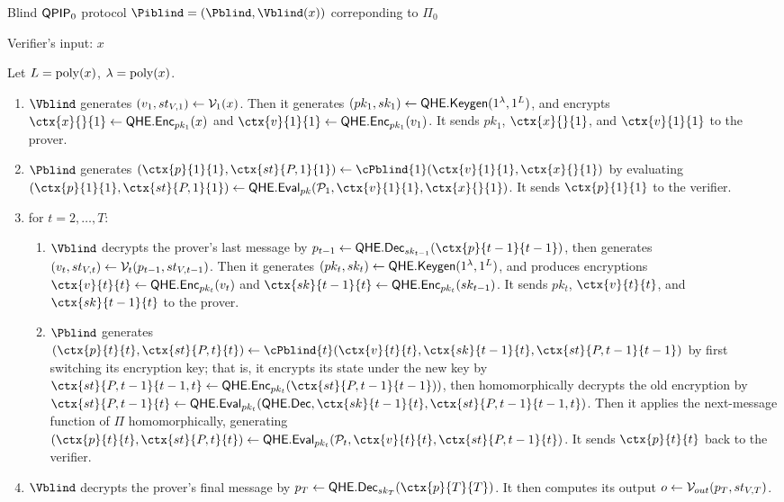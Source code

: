 \begin{protocol}{Blind $\operatorname{\mathsf{QPIP}}_0$ protocol $\Piblind=(\Pblind, \Vblind(x))$ correponding to $\Pi_0$}

	Verifier's input: $x$

	Let $L=\operatorname*{\operatorname{poly}}(x)$, $\lambda=\operatorname*{\operatorname{poly}}(x)$.

	\begin{enumerate}
		\item $\Vblind$ generates $(v_1, st_{V, 1})\leftarrow\mathcal{V}_1(x)$.
			Then it generates $(pk_1, sk_1)\leftarrow\mathsf{QHE.Keygen}(1^\lambda, 1^L)$,
			and encrypts $\ctx{x}{}{1}\leftarrow\QEnc_{pk_1}(x)$ and $\ctx{v}{1}{1}\leftarrow\QEnc_{pk_1}(v_1)$.
			It sends $pk_1$, $\ctx{x}{}{1}$, and $\ctx{v}{1}{1}$ to the prover.
		\item $\Pblind$ generates $(\ctx{p}{1}{1}, \ctx{st}{P, 1}{1})\leftarrow\cPblind{1}(\ctx{v}{1}{1}, \ctx{x}{}{1})$
			by evaluating $(\ctx{p}{1}{1}, \ctx{st}{P, 1}{1})\leftarrow\QEval_{pk}(\cP_1, \ctx{v}{1}{1}, \ctx{x}{}{1})$.
			It sends $\ctx{p}{1}{1}$ to the verifier.
		\item for $t=2,\ldots,T$:
		\begin{enumerate}
			\item $\Vblind$ decrypts the prover's last message by $p_{t-1}\leftarrow\QDec_{sk_{t-1}}(\ctx{p}{t-1}{t-1})$,
				then generates $(v_t, st_{V, t})\leftarrow\mathcal{V}_t(p_{t-1}, st_{V, t-1})$.
				Then it generates $(pk_t, sk_t)\leftarrow\mathsf{QHE.Keygen}(1^\lambda, 1^L)$,
				and produces encryptions $\ctx{v}{t}{t}\leftarrow\QEnc_{pk_t}(v_t)$ and $\ctx{sk}{t-1}{t}\leftarrow\QEnc_{pk_t}(sk_{t-1})$.
				It sends $pk_t$, $\ctx{v}{t}{t}$, and $\ctx{sk}{t-1}{t}$ to the prover.
			\item $\Pblind$ generates $(\ctx{p}{t}{t}, \ctx{st}{P, t}{t})\leftarrow\cPblind{t}(\ctx{v}{t}{t}, \ctx{sk}{t-1}{t}, \ctx{st}{P, t-1}{t-1})$
				by first switching its encryption key;
				that is, it encrypts its state under the new key by $\ctx{st}{P, t-1}{t-1, t}\leftarrow\QEnc_{pk_t}(\ctx{st}{P, t-1}{t-1}))$,
				then homomorphically decrypts the old encryption by
				$\ctx{st}{P, t-1}{t}\leftarrow\QEval_{pk_t}(\QDec, \ctx{sk}{t-1}{t}, \ctx{st}{P, t-1}{t-1, t})$.
				Then it applies the next-message function of $\Pi$ homomorphically, generating
				$(\ctx{p}{t}{t}, \ctx{st}{P, t}{t})\leftarrow\QEval_{pk_t}(\cP_t, \ctx{v}{t}{t}, \ctx{st}{P, t-1}{t})$.
				It sends $\ctx{p}{t}{t}$ back to the verifier.
		\end{enumerate}
		\item $\Vblind$ decrypts the prover's final message by $p_T\leftarrow\QDec_{sk_T}(\ctx{p}{T}{T})$.
			It then computes its output $o\leftarrow\mathcal{V}_{out}(p_T, st_{V, T})$.
	\end{enumerate}
\end{protocol}

